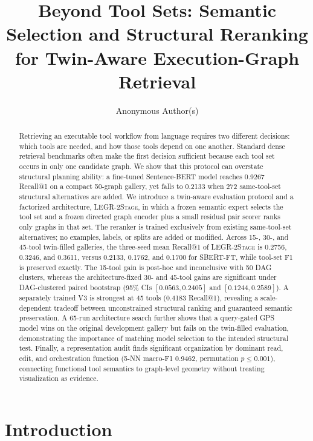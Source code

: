 \documentclass{article}
\title{Beyond Tool Sets: Semantic Selection and Structural Reranking\\
for Twin-Aware Execution-Graph Retrieval}
\author{Anonymous Author(s)}
\newcommand{\method}{\textsc{LEGR-2Stage}}
\newcommand{\sbert}{\textsc{SBERT-FT}}
\begin{document}
\maketitle

\begin{abstract}
Retrieving an executable tool workflow from language requires two different decisions: which tools are needed, and how those tools depend on one another.
Standard dense retrieval benchmarks often make the first decision sufficient because each tool set occurs in only one candidate graph.
We show that this protocol can overstate structural planning ability: a fine-tuned Sentence-BERT model reaches 0.9267 Recall@1 on a compact 50-graph gallery, yet falls to 0.2133 when 272 same-tool-set structural alternatives are added.
We introduce a twin-aware evaluation protocol and a factorized architecture, \method, in which a frozen semantic expert selects the tool set and a frozen directed graph encoder plus a small residual pair scorer ranks only graphs in that set.
The reranker is trained exclusively from existing same-tool-set alternatives; no examples, labels, or splits are added or modified.
Across 15-, 30-, and 45-tool twin-filled galleries, the three-seed mean Recall@1 of \method{} is 0.2756, 0.3246, and 0.3611, versus 0.2133, 0.1762, and 0.1700 for \sbert{}, while tool-set F1 is preserved exactly.
The 15-tool gain is post-hoc and inconclusive with 50 DAG clusters, whereas the architecture-fixed 30- and 45-tool gains are significant under DAG-clustered paired bootstrap (95\% CIs $[0.0563,0.2405]$ and $[0.1244,0.2589]$).
A separately trained V3 is strongest at 45 tools (0.4183 Recall@1), revealing a scale-dependent tradeoff between unconstrained structural ranking and guaranteed semantic preservation.
A 65-run architecture search further shows that a query-gated GPS model wins on the original development gallery but fails on the twin-filled evaluation, demonstrating the importance of matching model selection to the intended structural test.
Finally, a representation audit finds significant organization by dominant read, edit, and orchestration function (5-NN macro-F1 0.9462, permutation $p\leq0.001$), connecting functional tool semantics to graph-level geometry without treating visualization as evidence.
\end{abstract}

\section{Introduction}
\end{document}

